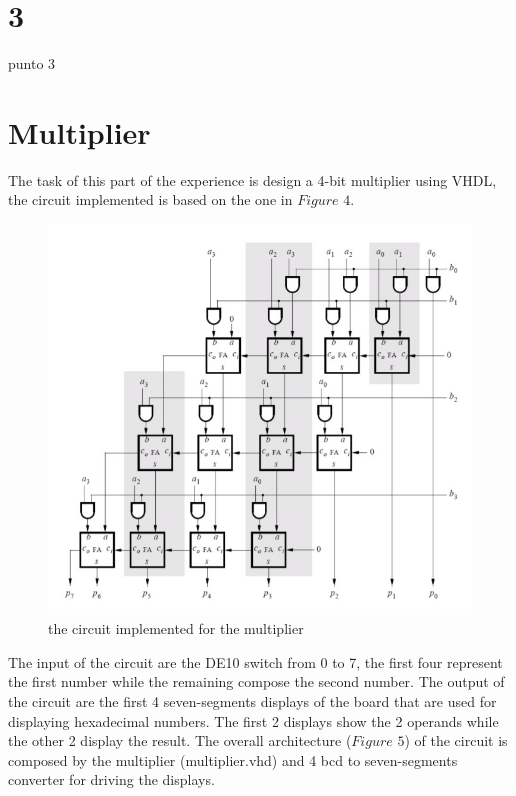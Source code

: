 \documentclass[12pt]{article}
\begin{document}
\section{3}
punto 3


\section{Multiplier}

The task of this part of the experience is design a 4-bit multiplier using VHDL, the circuit implemented is based on the one in $Figure$ $4$. 
\begin{figure}[h]
	\centering
	\includegraphics[scale = 0.4]{immagini/multiplier-circuit.jpg}
	\caption{the circuit implemented for the multiplier}       

\end{figure}
The input of the circuit are the DE10 switch from 0 to 7, the first four represent the first number while the remaining compose the second number.
The output of the circuit are the first 4 seven-segments displays of the board that are used for displaying hexadecimal numbers. The first 2 displays show the 2 operands while the other 2 display the result.
The overall architecture ($Figure$ $5$) of the circuit is composed by the multiplier (multiplier.vhd) and 4 bcd to seven-segments converter for driving the displays.
\end{document}
